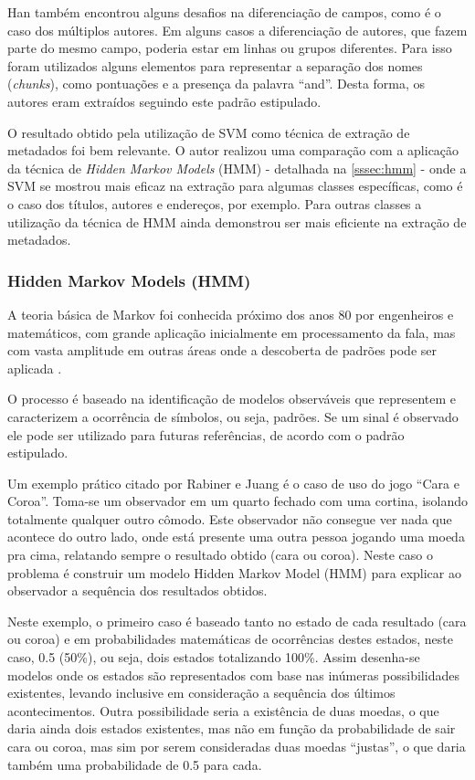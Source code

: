 Han também encontrou alguns desafios na diferenciação de campos, como é o caso dos múltiplos autores. Em alguns casos a diferenciação de autores, que fazem parte do mesmo campo, poderia estar em linhas ou grupos diferentes. Para isso foram utilizados alguns elementos para representar a separação dos nomes (\textit{chunks}), como pontuações e a presença da palavra ``and''. Desta forma, os autores eram extraídos seguindo este padrão estipulado.

O resultado obtido pela utilização de SVM como técnica de extração de metadados foi bem relevante. O autor realizou uma comparação com a aplicação da técnica de \emph{Hidden Markov Models} (HMM) - detalhada na \autoref{sssec:hmm} - onde a SVM se mostrou mais eficaz na extração para algumas classes específicas, como é o caso dos títulos, autores e endereços, por exemplo. Para outras classes a utilização da técnica de HMM ainda demonstrou ser mais eficiente na extração de metadados.

\subsubsection{Hidden Markov Models (HMM)}
\label{sssec:hmm}

A teoria básica de Markov foi conhecida próximo dos anos 80 por engenheiros e matemáticos, com grande aplicação inicialmente em processamento da fala, mas com vasta amplitude em outras áreas onde a descoberta de padrões pode ser aplicada \cite{Rabiner-HMM}.

O processo é baseado na identificação de modelos observáveis que representem e caracterizem a ocorrência de símbolos, ou seja, padrões. Se um sinal é observado ele pode ser utilizado para futuras referências, de acordo com o padrão estipulado. 

Um exemplo prático citado por Rabiner e Juang \cite{Rabiner-HMM} é o caso de uso do jogo ``Cara e Coroa''. Toma-se um observador em um quarto fechado com uma cortina, isolando totalmente qualquer outro cômodo. Este observador não consegue ver nada que acontece do outro lado, onde está presente uma outra pessoa jogando uma moeda pra cima, relatando sempre o resultado obtido (cara ou coroa). Neste caso o problema é construir um modelo Hidden Markov Model (HMM) para explicar ao observador a sequência dos resultados obtidos. 

Neste exemplo, o primeiro caso é baseado tanto no estado de cada resultado (cara ou coroa) e em probabilidades matemáticas de ocorrências destes estados, neste caso, 0.5 (50\%), ou seja, dois estados totalizando 100\%. Assim desenha-se modelos onde os estados são representados com base nas inúmeras possibilidades existentes, levando inclusive em consideração a sequência dos últimos acontecimentos. Outra possibilidade seria a existência de duas moedas, o que daria ainda dois estados existentes, mas não em função da probabilidade de sair cara ou coroa, mas sim por serem consideradas duas moedas ``justas'', o que daria também uma probabilidade de 0.5 para cada.

